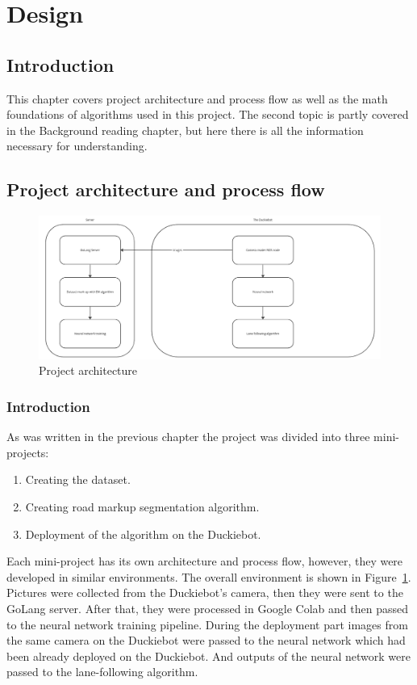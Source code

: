 \section{Design}
\subsection{Introduction}
This chapter covers project architecture and process flow as well as the math foundations of algorithms used in this project.
The second topic is partly covered in the Background reading chapter, but here there is all the information necessary for understanding.
\subsection{Project architecture and process flow}
\begin{figure}[ht]
    \includegraphics[scale=0.25]{src/Design/assets/ProjectArchitecture.png}
    \caption{Project architecture}\label{project_architecture}
\end{figure}
\subsubsection{Introduction}
As was written in the previous chapter the project was divided into three mini-projects:
\begin{enumerate}
    \item Creating the dataset.
    \item Creating road markup segmentation algorithm.
    \item Deployment of the algorithm on the Duckiebot.
\end{enumerate}
Each mini-project has its own architecture and process flow, however, they were developed in similar environments.
The overall environment is shown in Figure~\ref{project_architecture}. Pictures were collected from the Duckiebot's camera, then they were sent to the GoLang server. 
After that, they were processed in Google Colab and then passed to the neural network training pipeline. During the deployment part images from the same camera on the Duckiebot
were passed to the neural network which had been already deployed on the Duckiebot. And outputs of the neural network were passed to the lane-following algorithm.
